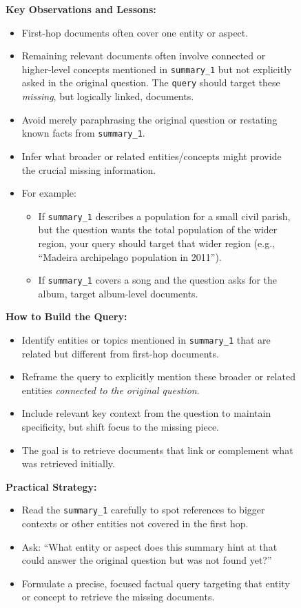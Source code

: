 \begin{figure}[!ht]
\begin{tcolorbox}
\vspace{1mm}
\textbf{Key Observations and Lessons:}
\begin{itemize}[left=0em]
    \item First-hop documents often cover one entity or aspect.
    \item Remaining relevant documents often involve connected or higher-level concepts mentioned in \texttt{summary\_1} but not explicitly asked in the original question. The \texttt{query} should target these \emph{missing}, but logically linked, documents.
    \item Avoid merely paraphrasing the original question or restating known facts from \texttt{summary\_1}.
    \item Infer what broader or related entities/concepts might provide the crucial missing information.
    \item For example:
    \begin{itemize}[left=1em]
        \item If \texttt{summary\_1} describes a population for a small civil parish, but the question wants the total population of the wider region, your query should target that wider region (e.g., ``Madeira archipelago population in 2011'').
        \item If \texttt{summary\_1} covers a song and the question asks for the album, target album-level documents.
    \end{itemize}
\end{itemize}

\vspace{1mm}
\textbf{How to Build the Query:}
\begin{itemize}[left=0em]
    \item Identify entities or topics mentioned in \texttt{summary\_1} that are related but different from first-hop documents.
    \item Reframe the query to explicitly mention these broader or related entities \emph{connected to the original question}.
    \item Include relevant key context from the question to maintain specificity, but shift focus to the missing piece.
    \item The goal is to retrieve documents that link or complement what was retrieved initially.
\end{itemize}

\vspace{1mm}
\textbf{Practical Strategy:}
\begin{itemize}[left=0em]
    \item Read the \texttt{summary\_1} carefully to spot references to bigger contexts or other entities not covered in the first hop.
    \item Ask: ``What entity or aspect does this summary hint at that could answer the original question but was not found yet?''
    \item Formulate a precise, focused factual query targeting that entity or concept to retrieve the missing documents.
\end{itemize}


\end{tcolorbox}
\end{figure}
